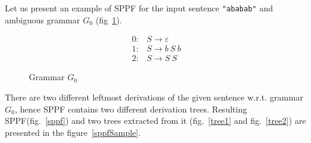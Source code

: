 Let us present an example of SPPF for the input sentence \verb|"ababab"| and ambiguous grammar $G_0$ (fig~\ref{grammarG0}).

\begin{figure}[h]
   \begin{center}
   \[
\begin{array}{rl}

   0: & S \rightarrow \varepsilon  \\
   1: & S \rightarrow b \ S \ b \\
   2: & S \rightarrow S \ S    
\end{array}
\]
   \caption{Grammar $G_0$}
   \label{grammarG0}        
   \end{center}
\end{figure}


There are two different leftmost derivations of the given sentence w.r.t. grammar $G_0$, hence SPPF contains two different derivation trees. Resulting SPPF(fig.~\ref{sppf}) and two trees extracted from it (fig.~\ref{tree1} and fig.~\ref{tree2}) are presented in the figure~\ref{sppfSample}. 
 
